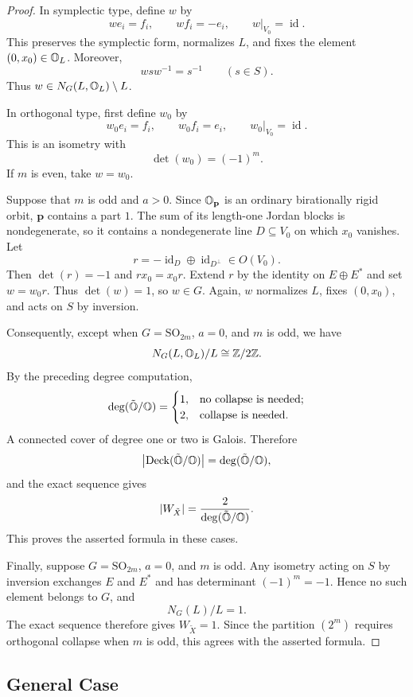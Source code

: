 \begin{proof}
  In symplectic type, define $w$ by
  \[
    we_i=f_i,\qquad wf_i=-e_i,\qquad
    w|_{V_0}=\operatorname{id}.
  \]
  This preserves the symplectic form, normalizes $L$,
  and fixes the element $(0,x_0)\in\mathbb{O}_L$.
  Moreover,
  \[
    wsw^{-1}=s^{-1}\qquad(s\in S).
  \]
  Thus $w\in N_G(L,\mathbb{O}_L)\setminus L$.

  In orthogonal type, first define $w_0$ by
  \[
    w_0e_i=f_i,\qquad w_0f_i=e_i,\qquad
    w_0|_{V_0}=\operatorname{id}.
  \]
  This is an isometry with
  \[
    \det(w_0)=(-1)^m.
  \]
  If $m$ is even, take $w=w_0$.

  Suppose that $m$ is odd and $a>0$.
  Since $\mathbb{O}_{\mathbf p}$ is an ordinary birationally
  rigid orbit, $\mathbf p$ contains a part $1$.
  The sum of its length-one Jordan blocks is
  nondegenerate, so it contains a nondegenerate line
  $D\subseteq V_0$ on which $x_0$ vanishes.
  Let
  \[
    r=-\operatorname{id}_D
       \oplus\operatorname{id}_{D^\perp}
    \in O(V_0).
  \]
  Then $\det(r)=-1$ and $rx_0=x_0r$.
  Extend $r$ by the identity on $E\oplus E^*$ and set
  $w=w_0r$.
  Thus $\det(w)=1$, so $w\in G$.
  Again, $w$ normalizes $L$, fixes $(0,x_0)$, and
  acts on $S$ by inversion.

  Consequently, except when $G=\mathrm{SO}_{2m}$,
  $a=0$, and $m$ is odd, we have
  \[
    N_G(L,\mathbb{O}_L)/L\cong\mathbb{Z}/2\mathbb{Z}.
  \]
  By the preceding degree computation,
  \[
    \deg(\tilde{\mathbb{O}}/\mathbb{O})=
    \begin{cases}
      1,&\text{no collapse is needed};\\
      2,&\text{collapse is needed}.
    \end{cases}
  \]
  A connected cover of degree one or two is Galois.
  Therefore
  \[
    \left|
      \operatorname{Deck}(\tilde{\mathbb{O}}/\mathbb{O})
    \right|
    =\deg(\tilde{\mathbb{O}}/\mathbb{O}),
  \]
  and the exact sequence gives
  \[
    |W_{\tilde X}|=
    \frac{2}{\deg(\tilde{\mathbb{O}}/\mathbb{O})}.
  \]
  This proves the asserted formula in these cases.

  Finally, suppose $G=\mathrm{SO}_{2m}$, $a=0$,
  and $m$ is odd.
  Any isometry acting on $S$ by inversion exchanges
  $E$ and $E^*$ and has determinant $(-1)^m=-1$.
  Hence no such element belongs to $G$, and
  \[
    N_G(L)/L=1.
  \]
  The exact sequence therefore gives $W_{\tilde X}=1$.
  Since the partition $(2^m)$ requires orthogonal
  collapse when $m$ is odd, this agrees with the
  asserted formula.
\end{proof}


\subsection{General Case}

